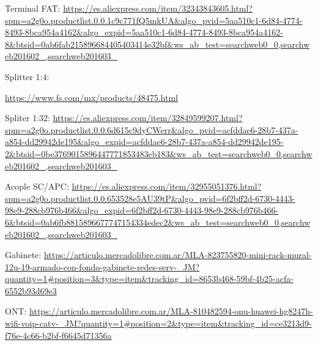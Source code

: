 \begin{thebibliography}{99}
 Terminal FAT: {\tiny \url{https://es.aliexpress.com/item/32343843605.html?spm=a2g0o.productlist.0.0.1c9c771fQ5mkUA&algo_pvid=5aa510c1-6d84-4774-8493-8bca954a4162&algo_expid=5aa510c1-6d84-4774-8493-8bca954a4162-8&btsid=0ab6fab215896684405403414e32bf&ws_ab_test=searchweb0_0,searchweb201602_,searchweb201603_}}


Splitter 1:4: \begin{tiny}
\url{https://www.fs.com/mx/products/48475.html}
\end{tiny}

 Spliter 1:32: {\tiny \url{https://es.aliexpress.com/item/32849599207.html?spm=a2g0o.productlist.0.0.6d615c9dyCWerr&algo_pvid=acfddae6-28b7-437a-a854-dd29942de195&algo_expid=acfddae6-28b7-437a-a854-dd29942de195-2&btsid=0be3769015896447771853483eb183&ws_ab_test=searchweb0_0,searchweb201602_,searchweb201603_}}

 Acople SC/APC: {\tiny \url{https://es.aliexpress.com/item/32955051376.html?spm=a2g0o.productlist.0.0.653528e5AU39tP&algo_pvid=6f2bff2d-6730-4443-98e9-288cb976b466&algo_expid=6f2bff2d-6730-4443-98e9-288cb976b466-6&btsid=0ab6fb8815896677747154334edec2&ws_ab_test=searchweb0_0,searchweb201602_,searchweb201603_}}


 Gabinete: {\tiny \url{https://articulo.mercadolibre.com.ar/MLA-823755820-mini-rack-mural-12u-19-armado-con-fondo-gabinete-redes-serv-_JM?quantity=1#position=3&type=item&tracking_id=8653b468-59bf-4b25-acfa-6552b93d69e3}}


 ONT: {\tiny \url{https://articulo.mercadolibre.com.ar/MLA-810482594-onu-huawei-hg8247h-wifi-voip-catv-_JM?quantity=1#position=2&type=item&tracking_id=ce3213d9-f76e-4c66-b2bf-f6645d71356a}}





\end{thebibliography}

